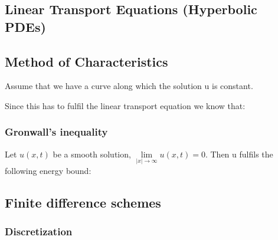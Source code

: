 \documentclass[10pt,a4paper]{scrartcl}
\begin{document}
\begin{multicols*}{3}
\section{Linear Transport Equations (Hyperbolic PDEs)}


\subsection{Method of Characteristics}

Assume that we have a curve along which the solution u is constant.




Since this has to fulfil the linear transport equation we know that:


\subsubsection{Gronwall's inequality}




Let $u(x,t)$ be a smooth solution, $\lim\limits_{|x|\rightarrow\infty}u(x,t)=0$. Then u fulfils the following energy bound:


\subsection{Finite difference schemes}

\subsubsection{Discretization}


\end{multicols*}
\end{document}
